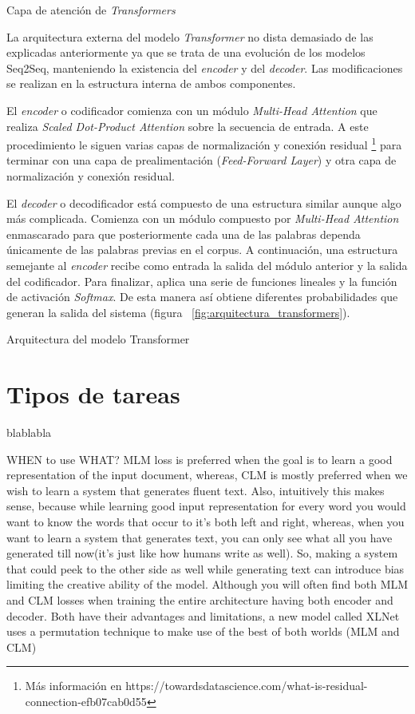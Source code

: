 %
{Capa de atención de \textit{Transformers} \citep{atencion_capas}}



La arquitectura externa del modelo \textit{Transformer} no dista demasiado de las explicadas anteriormente ya que se trata de una evolución de los modelos Seq2Seq, manteniendo la existencia del \textit{encoder} y del \textit{decoder}. Las modificaciones se realizan en la estructura interna de ambos componentes. 

El \textit{encoder} o codificador comienza con un módulo \textit{Multi-Head Attention} que realiza \textit{Scaled Dot-Product Attention} sobre la secuencia de entrada. A este procedimiento le siguen varias capas de normalización y conexión residual \footnote{Más información en https://towardsdatascience.com/what-is-residual-connection-efb07cab0d55} para terminar con una capa de prealimentación (\textit{Feed-Forward Layer}) y otra capa de normalización y conexión residual. 

El \textit{decoder} o decodificador está compuesto de una estructura similar aunque algo más complicada. Comienza con un módulo compuesto por \textit{Multi-Head Attention} enmascarado para que posteriormente cada una de las palabras dependa únicamente de las palabras previas en el corpus. A continuación, una estructura semejante al \textit{encoder} recibe como entrada la salida del módulo anterior y la salida del codificador. Para finalizar, aplica una serie de funciones lineales y la función de activación \textit{Softmax}. De esta manera así obtiene diferentes probabilidades que generan la salida del sistema (figura ~\ref{fig:arquitectura_transformers}).


%
{Arquitectura del modelo Transformer}


\section{Tipos de tareas}
blablabla

WHEN to use WHAT?
MLM loss is preferred when the goal is to learn a good representation of the input document, whereas, CLM is mostly preferred when we wish to learn a system that generates fluent text. Also, intuitively this makes sense, because while learning good input representation for every word you would want to know the words that occur to it’s both left and right, whereas, when you want to learn a system that generates text, you can only see what all you have generated till now(it’s just like how humans write as well). So, making a system that could peek to the other side as well while generating text can introduce bias limiting the creative ability of the model.
Although you will often find both MLM and CLM losses when training the entire architecture having both encoder and decoder. Both have their advantages and limitations, a new model called XLNet uses a permutation technique to make use of the best of both worlds (MLM and CLM)



